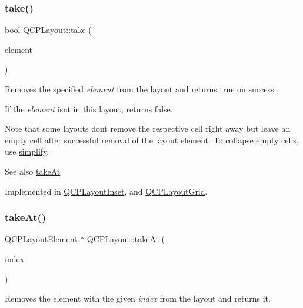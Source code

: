 \subsubsection{\texorpdfstring{take()}{take()}}
{\footnotesize\ttfamily bool Q\+C\+P\+Layout\+::take (\begin{DoxyParamCaption}\item[{\hyperlink{class_q_c_p_layout_element}{Q\+C\+P\+Layout\+Element} $\ast$}]{element }\end{DoxyParamCaption})\hspace{0.3cm}{\ttfamily [pure virtual]}}

Removes the specified {\itshape element} from the layout and returns true on success.

If the {\itshape element} isn\textquotesingle{}t in this layout, returns false.

Note that some layouts don\textquotesingle{}t remove the respective cell right away but leave an empty cell after successful removal of the layout element. To collapse empty cells, use \hyperlink{class_q_c_p_layout_a41e6ac049143866e8f8b4964efab01b2}{simplify}.

\begin{DoxySeeAlso}{See also}
\hyperlink{class_q_c_p_layout_a5a79621fa0a6eabb8b520cfc04fb601a}{take\+At} 
\end{DoxySeeAlso}


Implemented in \hyperlink{class_q_c_p_layout_inset_a9ac707ccff650633b97f52dd5cddcf49}{Q\+C\+P\+Layout\+Inset}, and \hyperlink{class_q_c_p_layout_grid_a666a9fe9e92054436f9b66eba25cca0c}{Q\+C\+P\+Layout\+Grid}.

\hypertarget{class_q_c_p_layout_a5a79621fa0a6eabb8b520cfc04fb601a}{}\label{class_q_c_p_layout_a5a79621fa0a6eabb8b520cfc04fb601a} 
\subsubsection{\texorpdfstring{take\+At()}{takeAt()}}
{\footnotesize\ttfamily \hyperlink{class_q_c_p_layout_element}{Q\+C\+P\+Layout\+Element} $\ast$ Q\+C\+P\+Layout\+::take\+At (\begin{DoxyParamCaption}\item[{int}]{index }\end{DoxyParamCaption})\hspace{0.3cm}{\ttfamily [pure virtual]}}

Removes the element with the given {\itshape index} from the layout and returns it.

